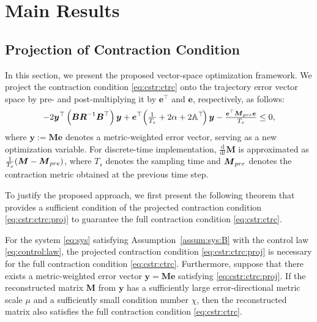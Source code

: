\documentclass{ifacconf}
\newcommand*{\mv}[1]{\boldsymbol{#1}} %
\newcommand*{\mm}[1]{\boldsymbol{#1}} %
\newcommand\der{\mathrm d}
\newcommand*{\ddtt}{
   \tfrac{\der}{\der t}
}
\begin{document}
\section{Main Results} \label{sec:main:results}

\subsection{Projection of Contraction Condition}

In this section, we present the proposed vector-space optimization framework.
We project the contraction condition \eqref{eq:cstr:ctrc} onto the trajectory error vector space by pre- and post-multiplying it by $\mv{e}^\top$ and $\mv{e}$, respectively, as follows:
\begin{equation} \label{eq:cstr:ctrc:proj}
   -
   2
   \mv{y}^\top 
   \left(
      \mm{B} 
      \mm{R}^{-1} 
      \mm{B}^\top
   \right)
   \mv{y}
   +
   \mv{e}^\top
   \!
   \left(
      \tfrac{1}{T_s}+2\alpha
      +
      2\mathbb{A}^\top
   \!
   \right)
   \mv{y}
   -
   \tfrac{\mv{e}^\top \mm{M}_{\rm{pre}} \mv{e}}{T_s}
   \le 0
   ,
\end{equation}
where $\mv{y}:=\mm{M}\mv{e}$ denotes a metric-weighted error vector, serving as a new optimization variable.
For discrete-time implementation, $\ddtt\mm{M}$ is approximated as $\tfrac{1}{T_s}(\mm{M}-\mm{M}_{\rm{pre}})$, where $T_s$ denotes the sampling time and $\mm{M}_{\rm{pre}}$ denotes the contraction metric obtained at the previous time step.

To justify the proposed approach, we first present the following theorem that provides a sufficient condition of the projected contraction condition \eqref{eq:cstr:ctrc:proj} to guarantee the full contraction condition \eqref{eq:cstr:ctrc}.

\begin{thm} \label{thm:proj:ctrc:suff}
   For the system \eqref{eq:sys} satisfying Assumption~\ref{assum:sys:B} with the control law \eqref{eq:control:law}, the projected contraction condition \eqref{eq:cstr:ctrc:proj} is necessary for the full contraction condition \eqref{eq:cstr:ctrc}.
   Furthermore, suppose that there exists a metric-weighted error vector $\mv y=\mm M\mv e$ satisfying \eqref{eq:cstr:ctrc:proj}.
   If the reconstructed matrix $\mm M$ from $\mv y$ has a sufficiently large error-directional metric scale $\mu$ and a sufficiently small condition number $\chi$, then the reconstructed matrix also satisfies the full contraction condition \eqref{eq:cstr:ctrc}.
\end{thm}
\end{document}
